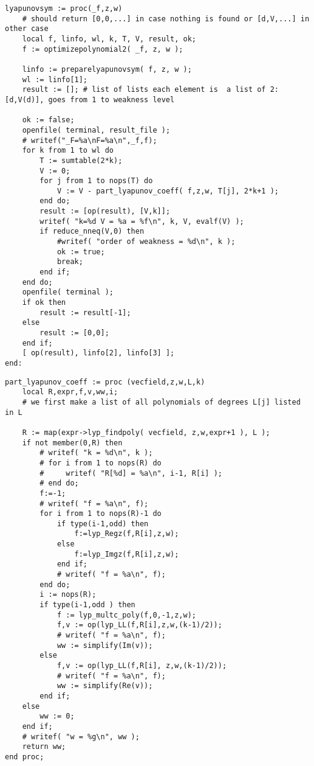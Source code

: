\documentclass[a4paper,10pt]{article}
\begin{document}
\begin{lstlisting}[name=weakfocus]
lyapunovsym := proc(_f,z,w)
    # should return [0,0,...] in case nothing is found or [d,V,...] in other case
    local f, linfo, wl, k, T, V, result, ok;
    f := optimizepolynomial2( _f, z, w );

    linfo := preparelyapunovsym( f, z, w );
    wl := linfo[1];
    result := []; # list of lists each element is  a list of 2: [d,V(d)], goes from 1 to weakness level

    ok := false;
    openfile( terminal, result_file );
    # writef("_F=%a\nF=%a\n",_f,f);
    for k from 1 to wl do
        T := sumtable(2*k);
        V := 0;
        for j from 1 to nops(T) do
            V := V - part_lyapunov_coeff( f,z,w, T[j], 2*k+1 );
        end do;
        result := [op(result), [V,k]];
        writef( "k=%d V = %a = %f\n", k, V, evalf(V) );
        if reduce_nneq(V,0) then
            #writef( "order of weakness = %d\n", k );
            ok := true;
            break;
        end if;
    end do;
    openfile( terminal );
    if ok then
        result := result[-1];
    else
        result := [0,0];
    end if;
    [ op(result), linfo[2], linfo[3] ];
end:
\end{lstlisting}

\begin{lstlisting}[name=weakfocus]
part_lyapunov_coeff := proc (vecfield,z,w,L,k)
    local R,expr,f,v,ww,i;
    # we first make a list of all polynomials of degrees L[j] listed in L

    R := map(expr->lyp_findpoly( vecfield, z,w,expr+1 ), L );
    if not member(0,R) then
        # writef( "k = %d\n", k );
        # for i from 1 to nops(R) do
        #     writef( "R[%d] = %a\n", i-1, R[i] );
        # end do;
        f:=-1;
        # writef( "f = %a\n", f);
        for i from 1 to nops(R)-1 do
            if type(i-1,odd) then
                f:=lyp_Regz(f,R[i],z,w);
            else
                f:=lyp_Imgz(f,R[i],z,w);
            end if;
            # writef( "f = %a\n", f);
        end do;
        i := nops(R);
        if type(i-1,odd ) then
            f := lyp_multc_poly(f,0,-1,z,w);
            f,v := op(lyp_LL(f,R[i],z,w,(k-1)/2));
            # writef( "f = %a\n", f);
            ww := simplify(Im(v));
        else
            f,v := op(lyp_LL(f,R[i], z,w,(k-1)/2));
            # writef( "f = %a\n", f);
            ww := simplify(Re(v));
        end if;
    else
        ww := 0;
    end if;
    # writef( "w = %g\n", ww );
    return ww;
end proc;
\end{lstlisting}
\end{document}
